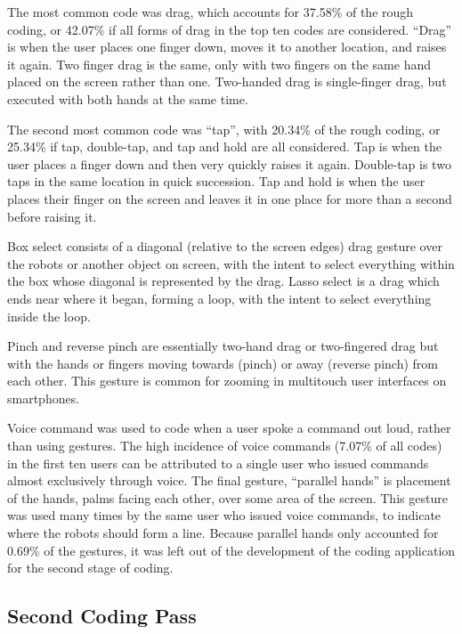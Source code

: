 The most common code was drag, which accounts for 37.58\% of the rough coding, or 42.07\% if all forms of drag in the top ten codes are considered. ``Drag'' is when the user places one finger down, moves it to another location, and raises it again. Two finger drag is the same, only with two fingers on the same hand placed on the screen rather than one. Two-handed drag is single-finger drag, but executed with both hands at the same time. 

The second most common code was ``tap'', with 20.34\% of the rough coding, or 25.34\% if tap, double-tap, and tap and hold are all considered. Tap is when the user places a finger down and then very quickly raises it again. Double-tap is two taps in the same location in quick succession. Tap and hold is when the user places their finger on the screen and leaves it in one place for more than a second before raising it. 

Box select consists of a diagonal (relative to the screen edges) drag gesture over the robots or another object on screen, with the intent to select everything within the box whose diagonal is represented by the drag. 
Lasso select is a drag which ends near where it began, forming a loop, with the intent to select everything inside the loop. 

Pinch and reverse pinch are essentially two-hand drag or two-fingered drag but with the hands or fingers moving towards (pinch) or away (reverse pinch) from each other.
This gesture is common for zooming in multitouch user interfaces on smartphones. 

Voice command was used to code when a user spoke a command out loud, rather than using gestures. The high incidence of voice commands (7.07\% of all codes) in the first ten users can be attributed to a single user who issued commands almost exclusively through voice. 
The final gesture, ``parallel hands'' is placement of the hands, palms facing each other, over some area of the screen. This gesture was used many times by the same user who issued voice commands, to indicate where the robots should form a line. Because parallel hands only accounted for 0.69\% of the gestures, it was left out of the development of the coding application for the second stage of coding. 

\subsection{Second Coding Pass} \label{section:Second_Coding_Pass}

